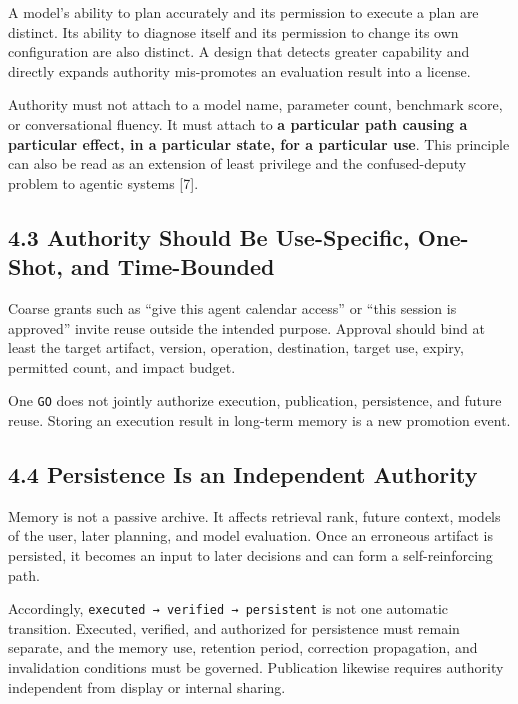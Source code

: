 A model's ability to plan accurately and its permission to execute a plan are distinct. Its ability to diagnose itself and its permission to change its own configuration are also distinct. A design that detects greater capability and directly expands authority mis-promotes an evaluation result into a license.

Authority must not attach to a model name, parameter count, benchmark score, or conversational fluency. It must attach to \textbf{a particular path causing a particular effect, in a particular state, for a particular use}. This principle can also be read as an extension of least privilege and the confused-deputy problem to agentic systems {[}7{]}.

\subsection{4.3 Authority Should Be Use-Specific, One-Shot, and Time-Bounded}\label{authority-should-be-use-specific-one-shot-and-time-bounded}

Coarse grants such as ``give this agent calendar access'' or ``this session is approved'' invite reuse outside the intended purpose. Approval should bind at least the target artifact, version, operation, destination, target use, expiry, permitted count, and impact budget.

One \passthrough{\lstinline!GO!} does not jointly authorize execution, publication, persistence, and future reuse. Storing an execution result in long-term memory is a new promotion event.

\subsection{4.4 Persistence Is an Independent Authority}\label{persistence-is-an-independent-authority}

Memory is not a passive archive. It affects retrieval rank, future context, models of the user, later planning, and model evaluation. Once an erroneous artifact is persisted, it becomes an input to later decisions and can form a self-reinforcing path.

Accordingly, \passthrough{\lstinline!executed → verified → persistent!} is not one automatic transition. Executed, verified, and authorized for persistence must remain separate, and the memory use, retention period, correction propagation, and invalidation conditions must be governed. Publication likewise requires authority independent from display or internal sharing.

